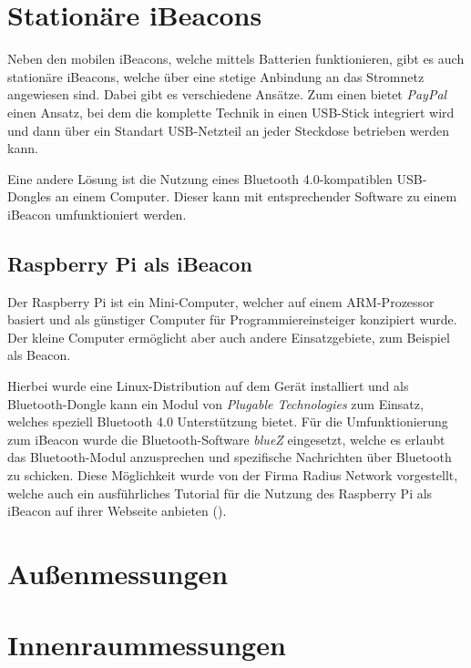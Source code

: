 \section{Stationäre iBeacons}
\label{sec:dataandmeasurement:stationarybeacon}
Neben den mobilen iBeacons, welche mittels Batterien funktionieren, gibt es auch stationäre iBeacons, welche über eine stetige Anbindung an das Stromnetz angewiesen sind.
Dabei gibt es verschiedene Ansätze.
Zum einen bietet \emph{PayPal} einen Ansatz, bei dem die komplette Technik in einen USB-Stick integriert wird und dann über ein Standart USB-Netzteil an jeder Steckdose betrieben werden kann.

Eine andere Lösung ist die Nutzung eines Bluetooth 4.0-kompatiblen USB-Dongles an einem Computer. Dieser kann mit entsprechender Software zu einem iBeacon umfunktioniert werden.

\subsection{Raspberry Pi als iBeacon}
\label{sec:dataandmeasurement:stationarybeacon:raspberrypi}
Der Raspberry Pi ist ein Mini-Computer, welcher auf einem ARM-Prozessor basiert und als günstiger Computer für Programmiereinsteiger konzipiert wurde. Der kleine Computer ermöglicht aber auch andere Einsatzgebiete, zum Beispiel als Beacon.

Hierbei wurde eine Linux-Distribution auf dem Gerät installiert und als Bluetooth-Dongle kann ein Modul von \emph{Plugable Technologies} zum Einsatz, welches speziell Bluetooth 4.0 Unterstützung bietet.
Für die Umfunktionierung zum iBeacon wurde die Bluetooth-Software \emph{blueZ} eingesetzt, welche es erlaubt das Bluetooth-Modul anzusprechen und spezifische Nachrichten über Bluetooth zu schicken.
Diese Möglichkeit wurde von der Firma Radius Network vorgestellt, welche auch ein ausführliches Tutorial für die Nutzung des Raspberry Pi als iBeacon auf ihrer Webseite anbieten (\citet{radiusraspberry}).



\section{Außenmessungen}
\label{sec:dataandmeasurement:outdoormeasure}

\section{Innenraummessungen}
\label{sec:dataandmeasurement:indoormeasure}
